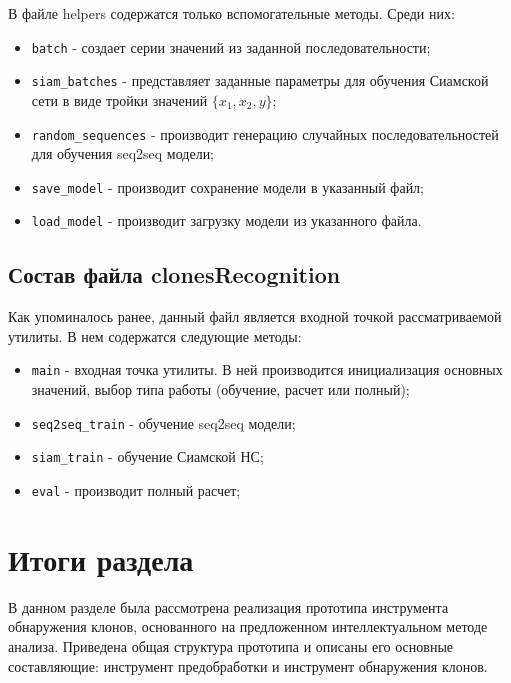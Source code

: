 В файле helpers содержатся только вспомогательные методы. Среди них:

\begin{itemize}
\setlength\itemsep{0mm}
\item \texttt{batch} - создает серии значений из заданной последовательности;
\item \texttt{siam\_batches} - представляет заданные параметры для обучения Сиамской сети в виде тройки значений \(\{x_1, x_2, y\}\);
\item \texttt{random\_sequences} - производит генерацию случайных последовательностей для обучения seq2seq модели;
\item \texttt{save\_model} - производит сохранение модели в указанный файл;
\item \texttt{load\_model} - производит загрузку модели из указанного файла.
\end{itemize}

\subsection{Состав файла clonesRecognition}

Как упоминалось ранее, данный файл является входной точкой рассматриваемой утилиты. В нем содержатся следующие методы:

\begin{itemize}
\setlength\itemsep{0mm}
\item \texttt{main} - входная точка утилиты. В ней производится инициализация основных значений, выбор типа работы (обучение, расчет или полный);
\item \texttt{seq2seq\_train} - обучение seq2seq модели;
\item \texttt{siam\_train} - обучение Сиамской НС;
\item \texttt{eval} - производит полный расчет;
\end{itemize}

\section{Итоги раздела}

В данном разделе была рассмотрена реализация прототипа инструмента обнаружения клонов, основанного на предложенном интеллектуальном методе анализа. Приведена общая структура прототипа и описаны его основные составляющие: инструмент предобработки и инструмент обнаружения клонов.
